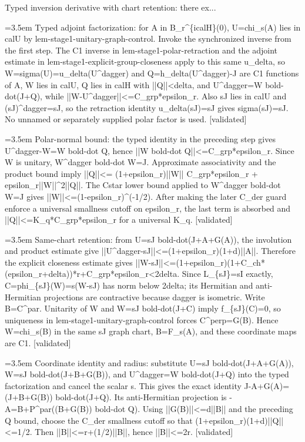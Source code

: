 \documentclass{article}
\newcommand{\step}[1]{\par\noindent\hangindent=3.5em\hangafter=1%
  \makebox[3.5em][l]{\textbf{#1.}}}
\newcommand{\steptag}[1]{\hfill{\small\textsf{[#1]}}}
\begin{document}
\begin{proofbox}{Typed inversion derivative with chart retention: there ex...}
\step{1.3} Typed adjoint factorization: for A in B\_r\textasciicircum{}\{icalH\}(0), U=chi\_s(A) lies in calU by lem-stage1-unitary-graph-control. Invoke the synchronized inverse from the first step. The C1 inverse in lem-stage1-polar-retraction and the adjoint estimate in lem-stage1-explicit-group-closeness apply to this same u\_delta, so W=sigma(U)=u\_delta(U\textasciicircum{}dagger) and Q=h\_delta(U\textasciicircum{}dagger)-J are C1 functions of A, W lies in calU, Q lies in calH with ||Q||<delta, and U\textasciicircum{}dagger=W bold-dot(J+Q), while ||W-U\textasciicircum{}dagger||<=C\_grp*epsilon\_r. Also sJ lies in calU and (sJ)\textasciicircum{}dagger=sJ, so the retraction identity u\_delta(sJ)=sJ gives sigma(sJ)=sJ. No unnamed or separately supplied polar factor is used. \steptag{validated} \\[4pt]
\step{1.4} Polar-normal bound: the typed identity in the preceding step gives U\textasciicircum{}dagger-W=W bold-dot Q, hence ||W bold-dot Q||<=C\_grp*epsilon\_r. Since W is unitary, W\textasciicircum{}dagger bold-dot W=J. Approximate associativity and the product bound imply ||Q||<= (1+epsilon\_r)||W|| C\_grp*epsilon\_r + epsilon\_r||W||\textasciicircum{}2||Q||. The Cstar lower bound applied to W\textasciicircum{}dagger bold-dot W=J gives ||W||<=(1-epsilon\_r)\textasciicircum{}(-1/2). After making the later C\_der guard enforce a universal smallness cutoff on epsilon\_r, the last term is absorbed and ||Q||<=K\_q*C\_grp*epsilon\_r for a universal K\_q. \steptag{validated} \\[4pt]
\step{1.5} Same-chart retention: from U=sJ bold-dot(J+A+G(A)), the involution and product estimate give ||U\textasciicircum{}dagger-sJ||<=(1+epsilon\_r)(1+d)||A||. Therefore the explicit closeness estimate gives ||W-sJ||<=(1+epsilon\_r)(1+C\_ch*(epsilon\_r+delta))*r+C\_grp*epsilon\_r<2delta. Since L\_\{sJ\}=sI exactly, C=phi\_\{sJ\}(W)=s(W-sJ) has norm below 2delta; its Hermitian and anti-Hermitian projections are contractive because dagger is isometric. Write B=C\textasciicircum{}par. Unitarity of W and W=sJ bold-dot(J+C) imply f\_\{sJ\}(C)=0, so uniqueness in lem-stage1-unitary-graph-control forces C\textasciicircum{}perp=G(B). Hence W=chi\_s(B) in the same sJ graph chart, B=F\_s(A), and these coordinate maps are C1. \steptag{validated} \\[4pt]
\step{1.6} Coordinate identity and radius: substitute U=sJ bold-dot(J+A+G(A)), W=sJ bold-dot(J+B+G(B)), and U\textasciicircum{}dagger=W bold-dot(J+Q) into the typed factorization and cancel the scalar s. This gives the exact identity J-A+G(A)=(J+B+G(B)) bold-dot(J+Q). Its anti-Hermitian projection is -A=B+P\textasciicircum{}par((B+G(B)) bold-dot Q). Using ||G(B)||<=d||B|| and the preceding Q bound, choose the C\_der smallness cutoff so that (1+epsilon\_r)(1+d)||Q||<=1/2. Then ||B||<=r+(1/2)||B||, hence ||B||<=2r. \steptag{validated} \\[4pt]

\end{proofbox}
\end{document}
